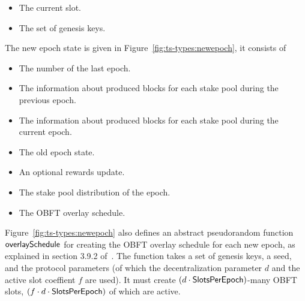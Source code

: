 \begin{itemize}
\item The current slot.
\item The set of genesis keys.
\end{itemize}
The new epoch state is given in Figure~\ref{fig:ts-types:newepoch}, it consists
of

\begin{itemize}
\item The number of the last epoch.
\item The information about produced blocks for each stake pool during the previous epoch.
\item The information about produced blocks for each stake pool during the current epoch.
\item The old epoch state.
\item An optional rewards update.
\item The stake pool distribution of the epoch.
\item The OBFT overlay schedule.
\end{itemize}

Figure~\ref{fig:ts-types:newepoch} also defines an abstract pseudorandom function
$\mathsf{overlaySchedule}$ for creating the OBFT overlay schedule for each new epoch,
as explained in section 3.9.2 of~\cite{delegation_design}.
The function takes a set of genesis keys, a seed, and the protocol parameters
(of which the decentralization parameter $d$ and the active slot coeffient $f$ are used).
It must create $(d\cdot\mathsf{SlotsPerEpoch})$-many OBFT slots, $(f\cdot d\cdot \mathsf{SlotsPerEpoch})$
of which are active.

